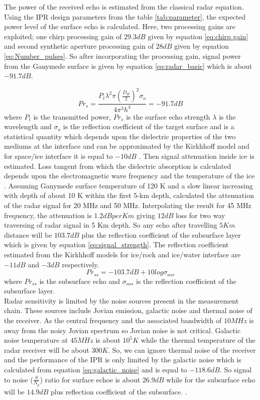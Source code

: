 The power of the received echo is estimated from the classical radar equation. Using the \ac{IPR} design parameters from the table \ref{tab:parameter}, the expected power level of the surface echo is calculated. Here, two processing gains are exploited; one chirp processing gain of $29.3 dB$ given by equation \ref{eq:chirp gain} and second synthetic aperture processing gain of $28 dB$ given by equation \ref{eq:Number_pulses}. So after incorporating the processing gain, signal power from the Ganymede surface is given by equation \ref{eq:radar_basic} which is about $-91.7 dB$.

\begin{equation}
Pr_{s} = \dfrac{P_{t}\lambda^{2}\pi(\frac{D_{pl}}{2})^{2}\sigma_{o}}{4\pi^{3}h^{4}} 
	  = -91.7 dB 
\label{eq:radar_basic}
\end{equation}
where $P_{t}$ is the transmitted power, $Pr_{s}$ is the surface echo strength $\lambda$ is the wavelength  and $\sigma_{o}$ is the reflection coefficient of the target surface and is a statistical quantity which depends upon the dielectric properties of the two mediums at the interface and can be approximated by the Kirkhhoff model \cite{MIMOSA} and for space/ice interface it is equal to $-10 dB$ .
%
Then signal attenuation inside ice is estimated. Loss tangent from which the dielectric absorption is calculated depends upon the electromagnetic wave frequency and the temperature of the ice \cite{MIMOSA}. Assuming Ganymede surface temperature of 120 K and a slow linear increasing with depth of about 10 K within the first 5-km depth, \cite{Gany_SRS} calculated the attenuation of the radar signal for 20 MHz and 50 MHz. Interpolating the result for 45 MHz frequency, the attenuation is $1.2 dB per Km$ giving $12 dB$ loss for two way traversing of radar signal in 5 Km depth. So any echo after travelling $5 Km $ distance will be $103.7 dB$ plus the reflection coefficient of the subsurface layer which is given by equation \ref{eq:signal_strength}. The reflection coefficient estimated from the Kirkhhoff models for ice/rock and ice/water interface are $-11dB$ and $-3 dB$ respectively.
%
\begin{equation}
Pr_{ss} = -103.7 dB + 10 log \sigma_{oss}
\label{eq:signal_strength}
\end{equation}
where $Pr_{ss}$ is the subsurface echo and $\sigma_{oss}$ is the reflection coefficient of the subsurface layer.\\
Radar sensitivity is limited by the noise sources present in the measurement chain. These sources include Jovian emission, galactic noise and thermal noise of the receiver.  As the central frequency and the associated bandwidth of $10 MHz$ is away from the noisy Jovian spectrum so Jovian noise is not critical. Galactic noise temperature at $45 MHz$ is about $10^{5}K$ while the thermal temperature of the radar receiver will be about  $300 K$. So, we can ignore thermal noise of the receiver and the performance of the \ac{IPR} is only limited by the galactic noise which is calculated from equation \ref{eq:galactic_noise} and is equal to $-118.6 dB$. So signal to noise ($\frac{S}{N_{g}}$) ratio for surface echoe is about $26.9 dB$ while for the subsurface echo will be $14.9 dB$ plus reflection coefficient of the subsurface. .
